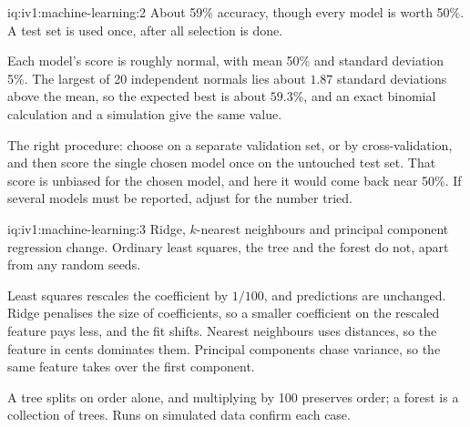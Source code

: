 \begin{solution}{iq:iv1:machine-learning:2}
About 59\% accuracy, though every model is worth 50\%. A test set is used once, after all selection is done.

Each model's score is roughly normal, with mean 50\% and standard deviation 5\%. The largest of 20 independent normals lies about $1.87$ standard deviations above the mean, so the expected best is about $59.3\%$, and an exact binomial calculation and a simulation give the same value.

The right procedure: choose on a separate validation set, or by cross-validation, and then score the single chosen model once on the untouched test set. That score is unbiased for the chosen model, and here it would come back near 50\%. If several models must be reported, adjust for the number tried.



\end{solution}

\begin{solution}{iq:iv1:machine-learning:3}
Ridge, $k$-nearest neighbours and principal component regression change. Ordinary least squares, the tree and the forest do not, apart from any random seeds.

Least squares rescales the coefficient by $1/100$, and predictions are unchanged. Ridge penalises the size of coefficients, so a smaller coefficient on the rescaled feature pays less, and the fit shifts. Nearest neighbours uses distances, so the feature in cents dominates them. Principal components chase variance, so the same feature takes over the first component.

A tree splits on order alone, and multiplying by 100 preserves order; a forest is a collection of trees. Runs on simulated data confirm each case.



\end{solution}

